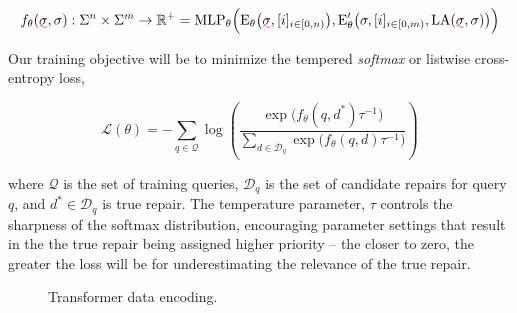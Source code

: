 \documentclass[sigplan,review,acmsmall,nonacm,screen,anonymous]{acmart}\settopmatter{printfolios=false,printccs=false,printacmref=false}
\begin{document}
\[
f_\theta(\err\sigma, \sigma): \Sigma^n \times \Sigma^m \rightarrow \mathbb{R}^+ = \text{MLP}_{\theta}\Big(\text{E}_\theta\big(\err\sigma, [i]_{i\in [0, n)}\big), \text{E}_\theta'\big(\sigma, [i]_{i \in [0, m)}, \text{LA}(\err\sigma, \sigma)\big)\Big)
\]

\noindent Our training objective will be to minimize the tempered \textit{softmax} or listwise cross-entropy loss,

\begin{equation}
\mathcal{L}(\theta) = -\sum_{q \in \mathcal{Q}} \log \left( \frac{\exp\big(f_\theta(q, d^*)\tau^{-1}\big)}{\sum_{d \in \mathcal{D}_q} \exp\big(f_\theta(q, d)\tau^{-1}\big)} \right)
\end{equation}

\noindent where $\mathcal{Q}$ is the set of training queries, $\mathcal{D}_q$ is the set of candidate repairs for query $q$, and $d^* \in \mathcal{D}_q$ is true repair. The temperature parameter, $\tau$ controls the sharpness of the softmax distribution, encouraging parameter settings that result in the the true repair being assigned higher priority -- the closer to zero, the greater the loss will be for underestimating the relevance of the true repair.


\begin{figure}
\caption{Transformer data encoding.}\label{fig:tx_data_encoding}
\end{figure}
\end{document}
